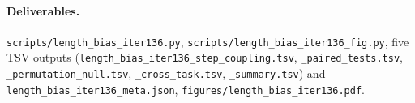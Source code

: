 \paragraph{Deliverables.}
\texttt{scripts/length\_bias\_iter136.py}, \texttt{scripts/length\_bias\_iter136\_fig.py},
five TSV outputs (\texttt{length\_bias\_iter136\_step\_coupling.tsv},
\texttt{\_paired\_tests.tsv}, \texttt{\_permutation\_null.tsv},
\texttt{\_cross\_task.tsv}, \texttt{\_summary.tsv}) and
\texttt{length\_bias\_iter136\_meta.json},
\texttt{figures/length\_bias\_iter136.pdf}.
